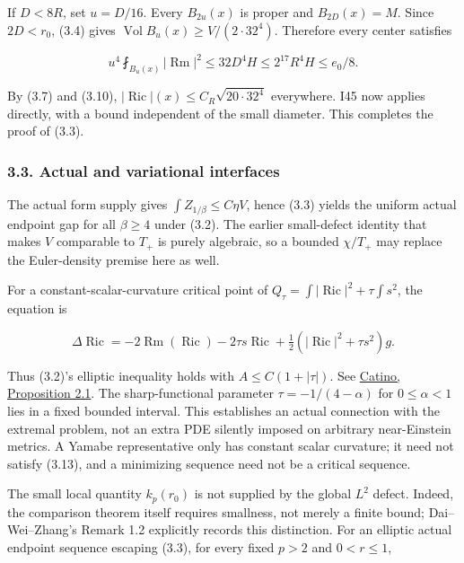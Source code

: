 \documentclass[
  10pt,
]{article}
\begin{document}
If \(D<8R\), set \(u=D/16\). Every \(B_{2u}(x)\) is proper and
\(B_{2D}(x)=M\). Since \(2D<r_0\), (3.4) gives
\(\operatorname{Vol}B_u(x)\ge V/(2\cdot32^4)\). Therefore every center
satisfies

\[
 u^4\fint_{B_u(x)}|\operatorname{Rm}|^2
              \le32D^4H\le2^{17}R^4H\le e_0/8.
\]

By (3.7) and (3.10),
\(|\operatorname{Ric}|(x)\le C_R\sqrt{20\cdot32^4}\) everywhere. I45 now
applies directly, with a bound independent of the small diameter. This
completes the proof of (3.3).

\hypertarget{actual-and-variational-interfaces}{%
\subsubsection{3.3. Actual and variational
interfaces}\label{actual-and-variational-interfaces}}

The actual form supply gives \(\int Z_{1/\beta}\le C\eta V\), hence
(3.3) yields the uniform actual endpoint gap for all \(\beta\ge4\) under
(3.2). The earlier small-defect identity that makes \(V\) comparable to
\(T_+\) is purely algebraic, so a bounded \(\chi/T_+\) may replace the
Euler-density premise here as well.

For a constant-scalar-curvature critical point of
\(Q_\tau=\int|\operatorname{Ric}|^2+\tau\int s^2\), the equation is

\[
 \Delta\operatorname{Ric}
 =-2\operatorname{Rm}(\operatorname{Ric})
   -2\tau s\operatorname{Ric}
                   +\tfrac12(|\operatorname{Ric}|^2+\tau s^2)g.
                                                        \tag{3.13}
\]

Thus (3.2)'s elliptic inequality holds with \(A\le C(1+|\tau|)\). See
\href{https://arxiv.org/abs/1404.0569}{Catino, Proposition 2.1}. The
sharp-functional parameter \(\tau=-1/(4-\alpha)\) for \(0\le\alpha<1\)
lies in a fixed bounded interval. This establishes an actual connection
with the extremal problem, not an extra PDE silently imposed on
arbitrary near-Einstein metrics. A Yamabe representative only has
constant scalar curvature; it need not satisfy (3.13), and a minimizing
sequence need not be a critical sequence.

The small local quantity \(k_p(r_0)\) is not supplied by the global
\(L^2\) defect. Indeed, the comparison theorem itself requires
smallness, not merely a finite bound; Dai--Wei--Zhang's Remark 1.2
explicitly records this distinction. For an elliptic actual endpoint
sequence escaping (3.3), for every fixed \(p>2\) and \(0<r\le1\),
\end{document}
